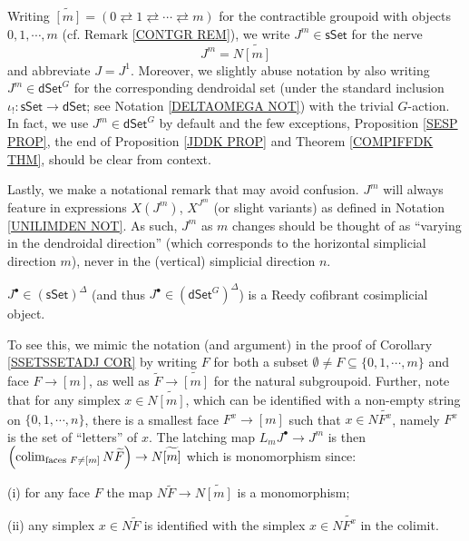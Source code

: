 \documentclass[a4paper,10pt
 ,draft
]{article}%
\begin{document}
\begin{notation}\label{JM NOT}
Writing
	$\widetilde{[m]} = 
	(0 \rightleftarrows 
	1 \rightleftarrows \cdots
	\rightleftarrows m)$
for the contractible groupoid with objects 
$0,1,\cdots,m$ (cf. Remark \ref{CONTGR REM}),
we write $J^m \in \mathsf{sSet}$ for the nerve
\[
J^m = N \widetilde{[m]}
\]
and abbreviate $J = J^1$.
Moreover, we slightly abuse notation by also writing $J^m \in \mathsf{dSet}^G$ for the corresponding dendroidal set 
(under the standard inclusion $\iota_! \colon \mathsf{sSet} \to \mathsf{dSet}$; see Notation \ref{DELTAOMEGA NOT}) with the trivial $G$-action.
In fact, we use $J^m \in \mathsf{dSet}^G$ by default and the few  exceptions,
Proposition \ref{SESP PROP},
the end of
Proposition \ref{JDDK PROP}
and
Theorem \ref{COMPIFFDK THM},
should be clear from context.

Lastly, we make a notational remark that may avoid confusion. $J^m$ will always feature in expressions $X(J^m)$, $X^{J^m}$ (or slight variants) as defined in Notation \ref{UNILIMDEN NOT}. As such, $J^{m}$ as $m$ changes should be thought of as ``varying in the dendroidal direction'' (which corresponds to the horizontal simplicial direction $m$), never in the (vertical) simplicial direction $n$.
\end{notation}


\begin{remark}\label{JREEDYCOF REM}
$J^{\bullet} \in \left(\mathsf{sSet}\right)^{\Delta}$ 
(and thus $J^{\bullet} \in \left(\mathsf{dSet}^G\right)^{\Delta}$) is a Reedy cofibrant cosimplicial object. 

To see this, we mimic the notation (and argument) in the proof of
Corollary \ref{SSETSSETADJ COR} by writing 
$F$ for both a subset $\emptyset \neq F \subseteq \{0,1,\cdots,m\}$
and face $F \to [m]$, as well as $\widetilde{F} \to \widetilde{[m]}$ for the natural subgroupoid.
Further, note that for any simplex $x \in N\widetilde{[m]}$, which can be identified with a non-empty string on $\{0,1,\cdots,n\}$, there is a smallest face $F^x \to [m]$ such that 
$x \in N\widetilde{F^x}$, namely $F^x$ is the set of ``letters'' of $x$.
The latching map $L_m J^{\bullet} \to J^m$ is then
$
\left(\mathop{\operatorname{colim}}_{\text{faces }F \neq [m]} N \widetilde{F}\right) \to N\widetilde{[m]}
$
which is monomorphism since:
\begin{inparaenum}
	\item[(i)] for any face $F$ the map $N \widetilde{F} \to N\widetilde{[m]}$ is a monomorphism;
	\item[(ii)] any simplex $x \in N \widetilde{F}$ is identified with the simplex $x \in N \widetilde{F^x}$ in the colimit.
\end{inparaenum}
\end{remark}
\end{document}
